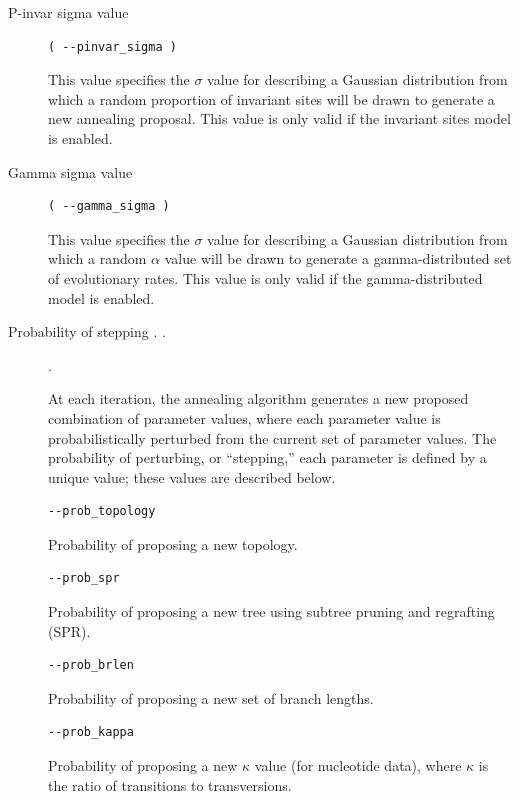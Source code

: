 \documentclass[11pt]{article}
\begin{document}
\begin{description}
\item[P-invar sigma value]
\begin{verbatim}
( --pinvar_sigma )
\end{verbatim}

This value specifies the $\sigma$ value for describing a Gaussian distribution from which a random proportion of invariant sites will be drawn to generate a new annealing proposal.  This value is only valid if the invariant sites model is enabled.

\item[Gamma sigma value]
\begin{verbatim}
( --gamma_sigma )
\end{verbatim}

This value specifies the $\sigma$ value for describing a Gaussian distribution from which a random $\alpha$ value will be drawn to generate a gamma-distributed set of evolutionary rates.  This value is only valid if the gamma-distributed model is enabled.


\item[Probability of stepping . .] .

At each iteration, the annealing algorithm generates a new proposed combination of parameter values, where each parameter value is probabilistically perturbed from the current set of parameter values.  The probability of perturbing, or ``stepping,'' each parameter is defined by a unique value; these values are described below.

\begin{verbatim}
--prob_topology
\end{verbatim}
Probability of proposing a new topology.

\begin{verbatim}
--prob_spr
\end{verbatim}
Probability of proposing a new tree using subtree pruning and regrafting (SPR).

\begin{verbatim}
--prob_brlen
\end{verbatim}
Probability of proposing a new set of branch lengths.

\begin{verbatim}
--prob_kappa
\end{verbatim}
Probability of proposing a new $\kappa$ value (for nucleotide data), where $\kappa$ is the ratio of transitions to transversions.


\end{description}
\end{document}
